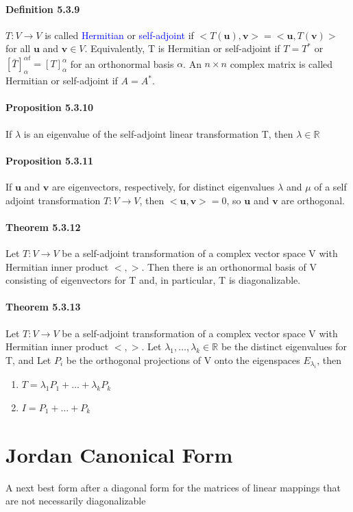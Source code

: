 \documentclass[11pt]{article}
\newcommand{\tb}[1]{\textbf{#1}}
\newcommand{\real}[0]{\mathbb{R}}
\newcommand{\vu}[0]{\tb{u}}
\newcommand{\vv}[0]{\tb{v}}
\begin{document}
{\paragraph{Definition 5.3.9} $T:V \rightarrow V$ is called \textcolor{blue}{Hermitian} or \textcolor{blue}{self-adjoint} if $<T(\vu), \vv> = <\vu,T(\vv)>$ for all $\vu$ and $\vv \in V$. Equivalently, T is Hermitian or self-adjoint if $T = T^*$ or $[\bar{T}]_\alpha^{\alpha t}= [T]_\alpha^\alpha$ for an orthonormal basis $\alpha$. An $n\times n$ complex matrix is called Hermitian or self-adjoint if $A = A^*$.
\paragraph{Proposition 5.3.10}
If $\lambda$ is an eigenvalue of the self-adjoint linear transformation T, then $\lambda \in \real$
\paragraph{Proposition 5.3.11} If $\vu$ and $\vv$ are eigenvectors, respectively, for distinct eigenvalues $\lambda$ and $\mu$ of a self adjoint transformation $T: V \rightarrow V$, then $<\vu, \vv> = 0$, so $\vu$ and $\vv$ are orthogonal.
\paragraph{Theorem 5.3.12} Let $T: V \rightarrow V$ be a self-adjoint transformation of a complex vector space V with Hermitian inner product $<,>$. Then there is an orthonormal basis of V consisting of eigenvectors for T and, in particular, T is diagonalizable.
\paragraph{Theorem 5.3.13} Let $T: V \rightarrow V$ be a self-adjoint transformation of a complex vector space V with Hermitian inner product $<,>$. Let $\lambda_1,\hdots,\lambda_k \in \real$ be the distinct eigenvalues for T, and Let $P_i$ be the orthogonal projections of V onto the eigenspaces $E	_{\lambda_i}$, then
\begin{enumerate}
	\item $T = \lambda_1P_1 + \hdots +\lambda_kP_k$
	\item $I = P_1 + \hdots + P_k$
\end{enumerate}
\section{Jordan Canonical Form}
A next best form after a diagonal form for the matrices of linear mappings that are not necessarily diagonalizable
}
\end{document}
